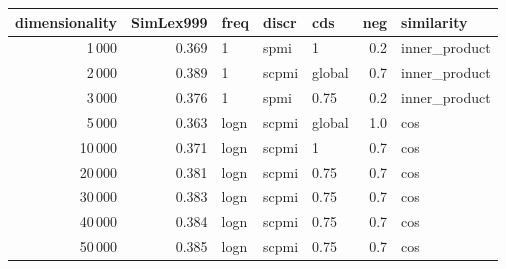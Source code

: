 \begin{tabular}{rrlllrl}
\toprule
 dimensionality &  SimLex999 &  freq &  discr &     cds &  neg &     similarity \\
\midrule
           1\,000 &      0.369 &     1 &   spmi &       1 &  0.2 &  inner\_product \\
           2\,000 &      0.389 &     1 &  scpmi &  global &  0.7 &  inner\_product \\
           3\,000 &      0.376 &     1 &   spmi &    0.75 &  0.2 &  inner\_product \\
           5\,000 &      0.363 &  logn &  scpmi &  global &  1.0 &            cos \\
          10\,000 &      0.371 &  logn &  scpmi &       1 &  0.7 &            cos \\
          20\,000 &      0.381 &  logn &  scpmi &    0.75 &  0.7 &            cos \\
          30\,000 &      0.383 &  logn &  scpmi &    0.75 &  0.7 &            cos \\
          40\,000 &      0.384 &  logn &  scpmi &    0.75 &  0.7 &            cos \\
          50\,000 &      0.385 &  logn &  scpmi &    0.75 &  0.7 &            cos \\
\bottomrule
\end{tabular}
